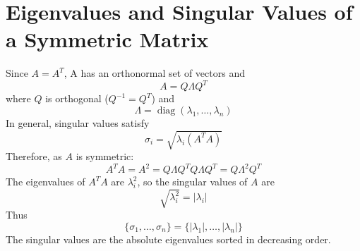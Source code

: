 \section{Eigenvalues and Singular Values of a Symmetric Matrix}

Since \(A=A^T\), A has an orthonormal set of vectors and
\[
A=Q\Lambda Q^T
\]
where \(Q\) is orthogonal ($Q^{-1}=Q^T$) and
\[
\Lambda=\operatorname{diag}(\lambda_1,\ldots,\lambda_n)
\]
In general, singular values satisfy
\[
\sigma_i = \sqrt{\lambda_i(A^T A)}
\]
Therefore, as $A$ is symmetric:
\[
A^TA=A^2=Q\Lambda Q^TQ\Lambda Q^T=Q\Lambda^2Q^T
\]
The eigenvalues of \(A^TA\) are \(\lambda_i^2\), so the singular values of
\(A\) are
\[
\sqrt{\lambda_i^2}=|\lambda_i|
\]
Thus
\[
\boxed{\{\sigma_1,\ldots,\sigma_n\}
=\{|\lambda_1|,\ldots,|\lambda_n|\}}
\]
The singular values are the absolute eigenvalues sorted in decreasing order.

